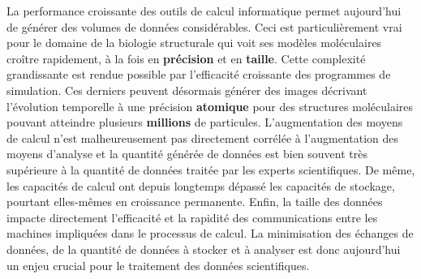 La performance croissante des outils de calcul informatique permet aujourd'hui de générer des volumes de données considérables. Ceci est particulièrement vrai pour le domaine de la biologie structurale qui voit ses modèles moléculaires croître rapidement, à la fois en \textbf{précision} et en \textbf{taille}. Cette complexité grandissante est rendue possible par l'efficacité croissante des programmes de simulation. Ces derniers peuvent désormais générer des images décrivant l'évolution temporelle à une précision \textbf{atomique} pour des structures moléculaires pouvant atteindre plusieurs \textbf{millions} de particules. L'augmentation des moyens de calcul n'est malheureusement pas directement corrélée à l'augmentation des moyens d'analyse et la quantité générée de données est bien souvent très supérieure à la quantité de données traitée par les experts scientifiques. De même, les capacités de calcul ont depuis longtemps dépassé les capacités de stockage, pourtant elles-mêmes en croissance permanente. Enfin, la taille des données impacte directement l'efficacité et la rapidité des communications entre les machines impliquées dans le processus de calcul. La minimisation des échanges de données, de la quantité de données à stocker et à analyser est donc aujourd'hui un enjeu crucial pour le traitement des données scientifiques.

